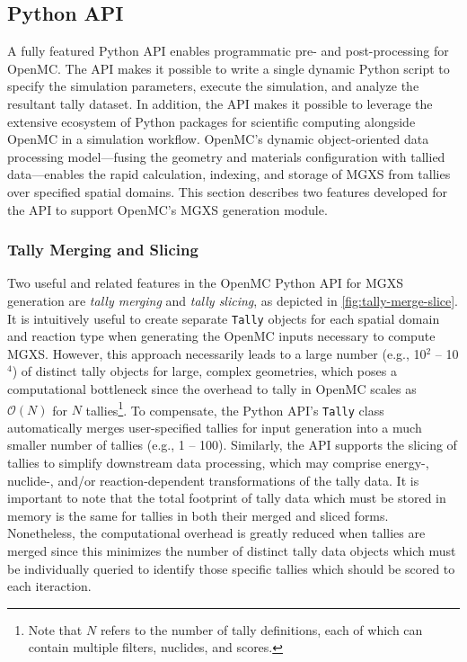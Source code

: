 \subsection{Python API}
\label{subsec:pyapi}

A fully featured Python API enables programmatic pre- and post-processing for OpenMC\cite{boyd2016bigdata}. The API makes it possible to write a single dynamic Python script to specify the simulation parameters, execute the simulation, and analyze the resultant tally dataset. In addition, the API makes it possible to leverage the extensive ecosystem of Python packages for scientific computing alongside OpenMC in a simulation workflow. OpenMC's dynamic object-oriented data processing model---fusing the geometry and materials configuration with tallied data---enables the rapid calculation, indexing, and storage of MGXS from tallies over specified spatial domains. This section describes two features developed for the API to support OpenMC's MGXS generation module.


\subsubsection{Tally Merging and Slicing}
\label{subsubsec:tally-slice-merge}

Two useful and related features in the OpenMC Python API for MGXS generation are \emph{tally merging} and \emph{tally slicing}, as depicted in \cref{fig:tally-merge-slice}. It is intuitively useful to create separate \texttt{Tally} objects for each spatial domain and reaction type when generating the OpenMC inputs necessary to compute MGXS. However, this approach necessarily leads to a large number (e.g., 10$^2$ -- 10$^4$) of distinct tally objects for large, complex geometries, which poses a computational bottleneck since the overhead to tally in OpenMC scales as $\mathcal{O}(N)$ for $N$ tallies\footnote{Note that $N$ refers to the number of tally definitions, each of which can contain multiple filters, nuclides, and scores.}. To compensate, the Python API's \texttt{Tally} class automatically merges user-specified tallies for input generation into a much smaller number of tallies (e.g., 1 -- 100). Similarly, the API supports the slicing of tallies to simplify downstream data processing, which may comprise energy-, nuclide-, and/or reaction-dependent transformations of the tally data. It is important to note that the total footprint of tally data which must be stored in memory is the same for tallies in both their merged and sliced forms. Nonetheless, the computational overhead is greatly reduced when tallies are merged since this minimizes the number of distinct tally data objects which must be individually queried to identify those specific tallies which should be scored to each iteraction.

